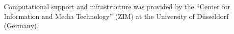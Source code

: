 \documentclass[conference,10pt,letterpaper,final]{IEEEtran}
\begin{document}
Computational support and infrastructure was provided by the “Center for Information and Media Technology” (ZIM) at the University of D\"usseldorf (Germany).


%
%
%
%
%
%
\end{document}
